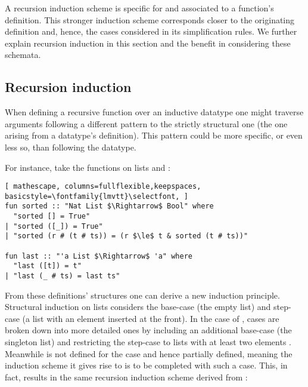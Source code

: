 \label{sec:rec-ind}

A recursion induction scheme is specific for and associated to a function's definition.
%
This stronger induction scheme corresponds closer to the originating definition and, hence, the cases considered in its simplification rules.
%
We further explain recursion induction in this section and the benefit in considering these schemata.

\subsection{Recursion induction}

When defining a recursive function over an inductive datatype one might traverse arguments following a different pattern to the strictly structural one (the one arising from a datatype's definition).
%
This pattern could be more specific, or even less so, than following the datatype.

For instance, take the functions on lists  and :

\begin{lstlisting}[ mathescape, columns=fullflexible,keepspaces, basicstyle=\fontfamily{lmvtt}\selectfont, ]
fun sorted :: "Nat List $\Rightarrow$ Bool" where
  "sorted [] = True"
| "sorted ([_]) = True"
| "sorted (r # (t # ts)) = (r $\le$ t & sorted (t # ts))"

fun last :: "'a List $\Rightarrow$ 'a" where
  "last ([t]) = t"
| "last (_ # ts) = last ts"
\end{lstlisting}

\noindent From these definitions' structures one can derive a new induction principle.
%
Structural induction on lists considers the base-case \isaCode{[]} (the empty list) and step-case  (a list with an element inserted at the front).
%
In the case of , cases are broken down into more detailed ones by including an additional base-case \isaCode{[t]} (the singleton list) and restricting the step-case to lists with at least two elements .
%
Meanwhile  is not defined for the case \isaCode{[]} and hence partially defined, meaning the induction scheme it gives rise to is to be completed with such a case.
%
This, in fact, results in the same recursion induction scheme derived from :


